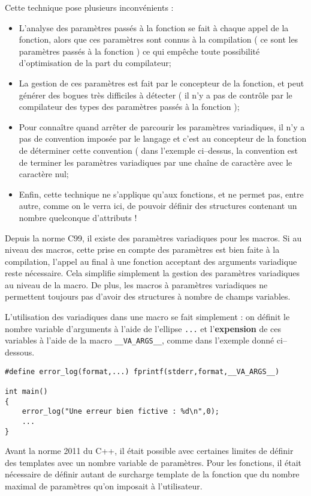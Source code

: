 \documentclass[a4]{article}
\begin{document}
Cette technique pose plusieurs inconvénients :
\begin{itemize}
\item L'analyse des paramètres passés à la fonction se fait à chaque appel de la fonction, alors que ces paramètres sont connus à la compilation ( ce sont les paramètres passés à la fonction ) ce qui empêche toute possibilité d'optimisation de la part du compilateur;
\item La gestion de ces paramètres est fait par le concepteur de la fonction, et peut générer des bogues très difficiles à détecter ( il n'y a pas de contrôle par le compilateur des types des paramètres passés à la fonction );
\item Pour connaître quand arrêter de parcourir les paramètres variadiques, il n'y a pas de convention imposée par le langage et c'est au
concepteur de la fonction de déterminer cette convention ( dans l'exemple ci--dessus, la convention est de terminer les paramètres
variadiques par une chaîne de caractère avec le caractère nul;
\item Enfin, cette technique ne s'applique qu'aux fonctions, et ne permet pas, entre autre, comme on le verra ici, de pouvoir définir des structures contenant un nombre quelconque d'attributs !
\end{itemize}

Depuis la norme C99, il existe des paramètres variadiques pour les macros. Si au niveau des macros, cette prise en compte des paramètres
est bien faite à la compilation, l'appel au final à une fonction acceptant des arguments variadique reste nécessaire. Cela simplifie simplement
la gestion des paramètres variadiques au niveau de la macro.
De plus, les macros à paramètres variadiques ne permettent toujours pas d'avoir des structures à nombre de champs
variables. 

L'utilisation des variadiques dans une macro se fait simplement :
on définit le nombre variable d'arguments à l'aide de l'ellipse \lstinline$...$ et l'\textbf{expension} de ces variables à l'aide
de la macro \lstinline$__VA_ARGS__$, comme dans l'exemple donné ci--dessous.

\begin{lstlisting}
#define error_log(format,...) fprintf(stderr,format,__VA_ARGS__)

int main()
{
    error_log("Une erreur bien fictive : %d\n",0);
    ...
}
\end{lstlisting}

Avant la norme 2011 du C++, il était possible avec certaines limites de définir des templates avec un nombre variable de paramètres. 
Pour les fonctions, il était nécessaire de définir autant de surcharge template de la fonction que du nombre maximal de paramètres
qu'on imposait à l'utilisateur.
\end{document}
